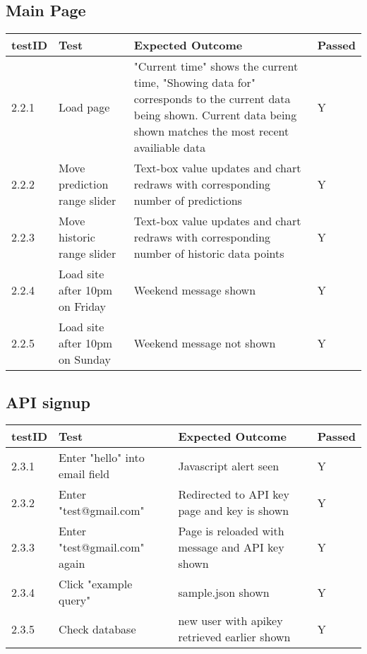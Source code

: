         \subsection{Main Page}
        \begin{tabular}{|p{1cm}|p{4cm}|p{4cm}|p{2cm}|}
            \hline
            testID & Test & Expected Outcome & Passed\\
            \hline
            2.2.1 & Load page & "Current time" shows the current time, "Showing data for" corresponds to the current data being shown. Current data being shown matches the most recent availiable data & Y\\
            \hline
            2.2.2 & Move prediction range slider & Text-box value updates and chart redraws with corresponding number of predictions & Y\\
            \hline 
            2.2.3 & Move historic range slider & Text-box value updates and chart redraws with corresponding number of historic data points & Y\\
            \hline 
            2.2.4 & Load site after 10pm on Friday & Weekend message shown & Y\\
            \hline
            2.2.5 & Load site after 10pm on Sunday & Weekend message not shown & Y\\
            \hline
        \end{tabular} 
    
        \subsection{API signup}
        \begin{tabular}{|p{1cm}|p{4cm}|p{4cm}|p{2cm}|}
            \hline
            testID & Test & Expected Outcome & Passed\\
            \hline
            2.3.1 & Enter "hello" into email field & Javascript alert seen & Y\\
            \hline 
            2.3.2 & Enter "test@gmail.com" & Redirected to API key page and key is shown & Y\\ 
            \hline
            2.3.3 & Enter "test@gmail.com" again & Page is reloaded with message and API key shown & Y\\
            \hline
            2.3.4 & Click "example query" & sample.json shown & Y\\
            \hline
            2.3.5 & Check database & new user with apikey retrieved earlier shown & Y\\
            \hline
        \end{tabular} 

